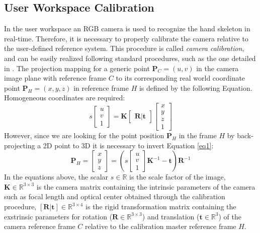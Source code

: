 \documentclass[letterpaper, 10 pt, conference]{ieeeconf}  %
\begin{document}
\subsection{User Workspace Calibration}
In the user workspace an RGB camera is used to recognize the hand skeleton in real-time. Therefore, it is necessary to properly calibrate the camera relative to the user-defined reference system. This procedure is called \textit{camera calibration}, and can be easily realized following standard procedures, such as the one detailed in \cite{MatlabCameraCalib}.
The projection mapping for a generic point $\mathbf{P}_{C} = (u,v)$ in the camera image plane with reference frame $C$ to its corresponding real world coordinate point $\mathbf{P}_{H} = (x,y,z)$ in reference frame $H$ is defined by the following Equation. Homogeneous coordinates are required:
\begin{equation}
s 
\begin{bmatrix}
u \\
v \\
1
\end{bmatrix}
=
\mathbf{K}
\begin{bmatrix}
\mathbf{R} | \mathbf{t}
\end{bmatrix}
\begin{bmatrix}
x \\
y \\
z \\
1
\end{bmatrix}
\label{eq1}
\end{equation}
However, since we are looking for the point position $\mathbf{P}_H$ in the frame $H$ by back-projecting a 2D point to 3D it is necessary to invert Equation \ref{eq1}:
\begin{equation}
\mathbf{P}_{H} = \begin{bmatrix}
x \\
y \\
z
\end{bmatrix}=
\left(s 
\begin{bmatrix}
u \\
v \\
1
\end{bmatrix}
\mathbf{K}^{-1}-\mathbf{t}\right)\mathbf{R}^{-1}
\label{eq2}
\end{equation}
In the equations above, the scalar $s\in\mathbb{R}$ is the scale factor of the image, $\mathbf{K}\in\mathbb{R}^{3\times3}$ is the camera matrix containing the intrinsic parameters of the camera such as focal length and optical center obtained through the calibration procedure, $\mathbf{[R|t]}\in\mathbb{R}^{3\times4}$ is the rigid transformation matrix containing the exstrinsic parameters for rotation ($\mathbf{R}\in\mathbb{R}^{3\times3}$) and translation ($\mathbf{t}\in\mathbb{R}^3$) of the camera reference frame $C$ relative to the calibration master reference frame $H$. 
\end{document}

